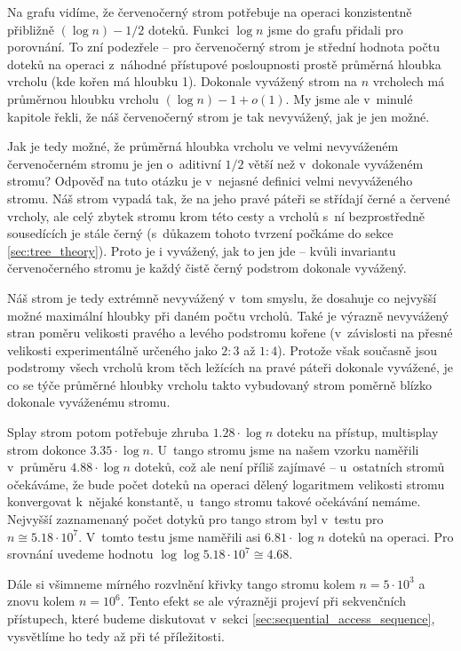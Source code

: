 Na grafu vidíme, že červenočerný strom potřebuje na operaci konzistentně přibližně $(\log
n) - 1/2$ doteků. Funkci $\log n$ jsme do grafu přidali pro porovnání. To zní podezřele --
pro červenočerný strom je střední hodnota počtu doteků na operaci z~náhodné
přístupové posloupnosti prostě průměrná hloubka vrcholu (kde kořen má hloubku
1). Dokonale vyvážený strom na $n$ vrcholech má průměrnou hloubku
vrcholu $(\log n) - 1 + o(1)$. My jsme ale v~minulé kapitole řekli, že náš
červenočerný strom je tak nevyvážený, jak je jen možné.

Jak je tedy možné, že průměrná hloubka vrcholu ve velmi nevyváženém
červenočerném stromu je jen o~aditivní $1/2$ větší než v~dokonale vyváženém
stromu? Odpověď na tuto otázku je v~nejasné definici velmi nevyváženého stromu.
Náš strom vypadá tak, že na jeho pravé páteři se střídají černé a červené
vrcholy, ale celý zbytek stromu krom této cesty a vrcholů s~ní bezprostředně
sousedících je stále černý (s~důkazem tohoto tvrzení počkáme do sekce \ref{sec:tree_theory}). Proto je i vyvážený, jak to jen jde -- kvůli
invariantu červenočerného stromu je každý čistě černý podstrom dokonale
vyvážený.

Náš strom je
tedy extrémně nevyvážený v~tom smyslu, že dosahuje co nejvyšší možné maximální
hloubky při daném počtu vrcholů. Také je výrazně nevyvážený stran poměru
velikosti pravého a levého podstromu kořene (v~závislosti na přesné velikosti
experimentálně určeného jako $2:3$ až $1:4$). Protože však současně jsou
podstromy všech vrcholů krom těch ležících na pravé páteři dokonale
vyvážené, je co se týče průměrné hloubky vrcholu takto vybudovaný strom poměrně
blízko dokonale vyváženému stromu.


Splay strom potom potřebuje zhruba $1.28\cdot \log n$ doteku na přístup, multisplay strom
dokonce $3.35\cdot \log n$. U~tango stromu jsme na našem vzorku naměřili
v~průměru $4.88\cdot \log n$ doteků, což ale není příliš zajímavé -- u~ostatních
stromů očekáváme, že bude počet doteků na operaci dělený logaritmem velikosti stromu konvergovat
k~nějaké konstantě, u~tango stromu takové očekávání nemáme. Nejvyšší zaznamenaný
počet dotyků pro tango strom byl v~testu pro $n \cong 5.18\cdot 10^7$. V~tomto
testu jsme naměřili asi $6.81\cdot \log n$ doteků na operaci. Pro srovnání uvedeme hodnotu
$\log\log 5.18\cdot 10^7 \cong 4.68$. 

Dále si všimneme mírného rozvlnění křivky tango stromu kolem $n=5\cdot 10^3$ a
znovu kolem $n= 10^6$. Tento efekt se ale výrazněji projeví při
sekvenčních přístupech, které budeme diskutovat v~sekci \ref{sec:sequential_access_sequence}, vysvětlíme ho tedy až při té příležitosti.

